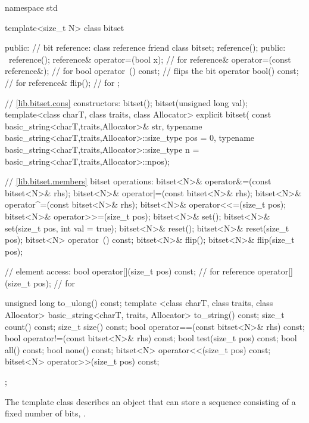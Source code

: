 \begin{codeblock}
namespace std {
  template<size_t N> class bitset {
  public:
    // bit reference:
    class reference {
      friend class bitset;
      reference();
    public:
     ~reference();
      reference& operator=(bool x);             // for 
      reference& operator=(const reference&);   // for 
      bool operator~() const;                   // flips the bit
      operator bool() const;                    // for 
      reference& flip();                        // for 
    };

    // \ref{lib.bitset.cons} constructors:
    bitset();
    bitset(unsigned long val);
    template<class charT, class traits, class Allocator>
      explicit bitset(
        const basic_string<charT,traits,Allocator>& str,
        typename basic_string<charT,traits,Allocator>::size_type pos = 0,
        typename basic_string<charT,traits,Allocator>::size_type n =
          basic_string<charT,traits,Allocator>::npos);

    // \ref{lib.bitset.members} bitset operations:
    bitset<N>& operator&=(const bitset<N>& rhs);
    bitset<N>& operator|=(const bitset<N>& rhs);
    bitset<N>& operator^=(const bitset<N>& rhs);
    bitset<N>& operator<<=(size_t pos);
    bitset<N>& operator>>=(size_t pos);
    bitset<N>& set();
    bitset<N>& set(size_t pos, int val = true);
    bitset<N>& reset();
    bitset<N>& reset(size_t pos);
    bitset<N>  operator~() const;
    bitset<N>& flip();
    bitset<N>& flip(size_t pos);

    // element access:
    bool operator[](size_t pos) const;        // for 
    reference operator[](size_t pos);         // for 

    unsigned long  to_ulong() const;
    template <class charT, class traits, class Allocator>
      basic_string<charT, traits, Allocator> to_string() const;
    size_t count() const;
    size_t size()  const;
    bool operator==(const bitset<N>& rhs) const;
    bool operator!=(const bitset<N>& rhs) const;
    bool test(size_t pos) const;
    bool all() const;
    bool none() const;
    bitset<N> operator<<(size_t pos) const;
    bitset<N> operator>>(size_t pos) const;
  };
}
\end{codeblock}

\pnum
The template class
%
describes an object that can store a sequence consisting of a fixed number of
bits, .

